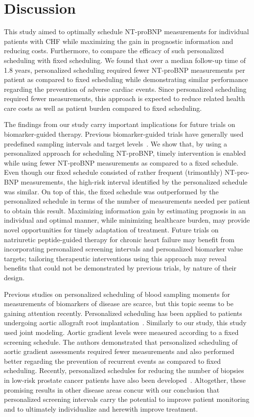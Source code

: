 \section{Discussion}
\label{c6:sec:discussion}
This study aimed to optimally schedule NT-proBNP measurements for individual patients with CHF while maximizing the gain in prognostic information and reducing costs. Furthermore, to compare the efficacy of such personalized scheduling with fixed scheduling. We found that over a median follow-up time of 1.8 years, personalized scheduling required fewer NT-proBNP measurements per patient as compared to fixed scheduling while demonstrating similar performance regarding the prevention of adverse cardiac events. Since personalized scheduling required fewer measurements, this approach is expected to reduce related health care costs as well as patient burden compared to fixed scheduling.

The findings from our study carry important implications for future trials on biomarker-guided therapy. Previous biomarker-guided trials have generally used predefined sampling intervals and target levels~\citep{khan2018does,felker2017effect}. We show that, by using a personalized approach for scheduling NT-proBNP, timely intervention is enabled while using fewer NT-proBNP measurements as compared to a fixed schedule. Even though our fixed schedule consisted of rather frequent (trimonthly) NT-pro-BNP measurements, the high-risk interval identified by the personalized schedule was similar. On top of this, the fixed schedule was outperformed by the personalized schedule in terms of the number of measurements needed per patient to obtain this result. Maximizing information gain by estimating prognosis in an individual and optimal manner, while minimizing healthcare burden, may provide novel opportunities for timely adaptation of treatment. Future trials on natriuretic peptide-guided therapy for chronic heart failure may benefit from incorporating personalized screening intervals and personalized biomarker value targets; tailoring therapeutic interventions using this approach may reveal benefits that could not be demonstrated by previous trials, by nature of their design. 

Previous studies on personalized scheduling of blood sampling moments for measurements of biomarkers of disease are scarce, but this topic seems to be gaining attention recently. Personalized scheduling has been applied to patients undergoing aortic allograft root implantation~\citep{rizopoulos2016personalized}. Similarly to our study, this study used joint modeling. Aortic gradient levels were measured according to a fixed screening schedule. The authors demonstrated that personalized scheduling of aortic gradient assessments required fewer measurements and also performed better regarding the prevention of recurrent events as compared to fixed scheduling. Recently, personalized schedules for reducing the number of biopsies in low-risk prostate cancer patients have also been developed~\citep{tomer2019personalized}. Altogether, these promising results in other disease areas concur with our conclusion that personalized screening intervals carry the potential to improve patient monitoring and to ultimately individualize and herewith improve treatment.

